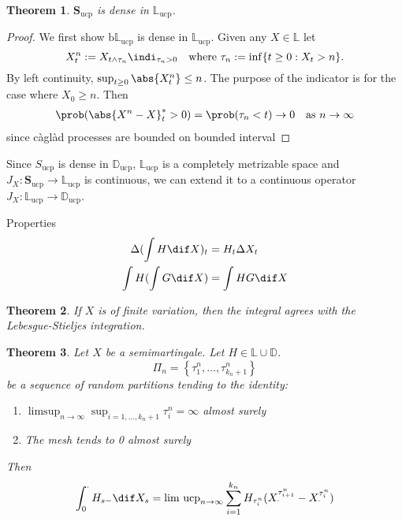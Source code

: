 \documentclass{scrreprt}
\theoremstyle{mydefn}
\newtheorem{theorem}{Theorem}
\theoremstyle{remark}
\newcommand{\caglad}{c\`agl\`ad}
\newcommand{\simpro}{\mathbf S}
\newcommand{\cadspace}{\mathbb D}
\newcommand{\cagspace}{\mathbb L}
\newcommand{\ucp}{\text{ucp}}
\newcommand{\bdd}{\text{b}}
\newcommand\defeq{:=}
\begin{document}
\begin{theorem}
	$\simpro_{\ucp}$ is dense in $\cagspace_{\ucp}$.
\end{theorem}
\begin{proof}
	We first show $\bdd \cagspace_{\ucp}$ is dense in $\cagspace_{\ucp}$. Given any $X \in \cagspace$ let
	\begin{equation}
		X^n_t \defeq X_{t \wedge \tau_n} \indi_{\tau_n > 0} \quad \text{where}\ \tau_n := \inf \{t \geq 0 : X_t > n\}.
	\end{equation}
	By left continuity, $\sup_{t \geq 0} \abs{X^n_t} \leq n$. The purpose of the indicator is for the case where $X_0 \geq n$. Then
	\begin{align}
		\prob(\abs{X^n - X}^*_t > 0)
		= \prob(\tau_n < t) \to 0 \quad \text{as $n \to \infty$}
	\end{align}
	since \caglad{} processes are bounded on bounded interval
\end{proof}

Since $S_{\ucp}$ is dense in $\cadspace_{\ucp}$, $\cagspace_{\ucp}$ is a completely metrizable space and $J_X: \simpro_{\ucp} \to \cagspace_{\ucp}$ is continuous, we can extend it to a continuous operator $J_X: \cagspace_{\ucp} \to \cadspace_{\ucp}$.

Properties
\begin{align}
	\Delta(\int H \dif X)_t &= H_t \Delta X_t \\
	\int H (\int G \dif X) &= \int HG \dif X
\end{align}

\begin{theorem}
	If $X$ is of finite variation, then the integral agrees with the Lebesgue-Stieljes integration.
\end{theorem}

\begin{theorem}
	Let $X$ be a semimartingale. Let $H \in \cagspace \cup \cadspace$.
	\begin{equation}
		\Pi_n = \left\{ \tau_1^n, \ldots, \tau_{k_n+1}^n \right\}
	\end{equation}
	be a sequence of random partitions tending to the identity:
	\begin{enumerate}
		\item $\limsup_{n \to \infty} \sup_{i = 1, \ldots, k_n + 1} \tau^n_i = \infty$ almost surely
		\item The mesh tends to 0 almost surely
	\end{enumerate}
	Then
	\begin{equation}
		\int_0^{\cdot} H_{s-} \dif X_s =
		\text{lim ucp}_{n \to \infty}
		\sum_{i=1}^{k_n} H_{\tau^n_i}(X^{\tau^n_{i+1}}_{\cdot} - X^{\tau^n_i}_{\cdot})
	\end{equation}
\end{theorem}
\end{document}
